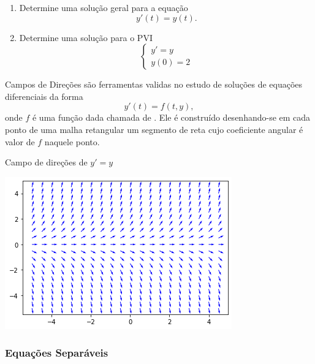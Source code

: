 \begin{frame}
\begin{casa}
\begin{enumerate}
\item Determine uma solução geral para a equação
\[y'(t)=y(t).\]

\item Determine uma solução para o PVI
\begin{equation*}
\begin{cases}
y'=y\\
y(0)=2
\end{cases}
\end{equation*}
\end{enumerate}



\end{casa}
\end{frame}

\begin{frame}{Campos de Direções}
 são ferramentas validas no estudo de soluções de equações diferenciais da forma
\[y'(t)=f(t,y),\]
onde $f$ é uma função dada chamada de . Ele é construído desenhando-se em cada ponto de uma malha retangular um segmento de reta  cujo coeficiente angular é valor de $f$ naquele ponto.


\end{frame}

\begin{frame}
\begin{exe}
Campo de direções de $y'=y$
\begin{center}
\includegraphics[scale=0.7]{CD-1.png}
\end{center}
\end{exe}
\end{frame}



\begin{frame}
\frametitle{Equações Separáveis }

\end{frame}


